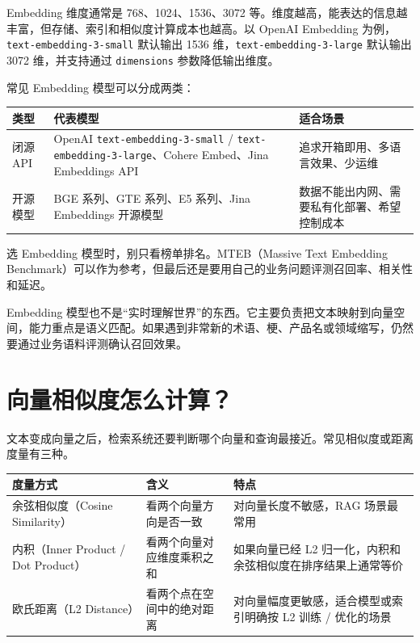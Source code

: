 \documentclass[10pt,a4paper]{ctexart}
\begin{document}
Embedding 维度通常是 768、1024、1536、3072 等。维度越高，能表达的信息越丰富，但存储、索引和相似度计算成本也越高。以 OpenAI Embedding 为例，\texttt{text-embedding-3-small} 默认输出 1536 维，\texttt{text-embedding-3-large} 默认输出 3072 维，并支持通过 \texttt{dimensions} 参数降低输出维度。



常见 Embedding 模型可以分成两类：


{\footnotesize
\begin{tabularx}{\textwidth}{|X|X|X|}
\hline
\textbf{类型} & \textbf{代表模型} & \textbf{适合场景} \\
\hline
闭源 API & OpenAI \texttt{text-embedding-3-small} / \texttt{text-embedding-3-large}、Cohere Embed、Jina Embeddings API & 追求开箱即用、多语言效果、少运维 \\
\hline
开源模型 & BGE 系列、GTE 系列、E5 系列、Jina Embeddings 开源模型 & 数据不能出内网、需要私有化部署、希望控制成本 \\
\hline
\end{tabularx}
}



选 Embedding 模型时，别只看榜单排名。MTEB（Massive Text Embedding Benchmark）可以作为参考，但最后还是要用自己的业务问题评测召回率、相关性和延迟。



Embedding 模型也不是“实时理解世界”的东西。它主要负责把文本映射到向量空间，能力重点是语义匹配。如果遇到非常新的术语、梗、产品名或领域缩写，仍然要通过业务语料评测确认召回效果。



\section{向量相似度怎么计算？}


文本变成向量之后，检索系统还要判断哪个向量和查询最接近。常见相似度或距离度量有三种。


{\footnotesize
\begin{tabularx}{\textwidth}{|X|X|X|}
\hline
\textbf{度量方式} & \textbf{含义} & \textbf{特点} \\
\hline
余弦相似度（Cosine Similarity） & 看两个向量方向是否一致 & 对向量长度不敏感，RAG 场景最常用 \\
\hline
内积（Inner Product / Dot Product） & 看两个向量对应维度乘积之和 & 如果向量已经 L2 归一化，内积和余弦相似度在排序结果上通常等价 \\
\hline
欧氏距离（L2 Distance） & 看两个点在空间中的绝对距离 & 对向量幅度更敏感，适合模型或索引明确按 L2 训练 / 优化的场景 \\
\hline
\end{tabularx}
}
\end{document}
